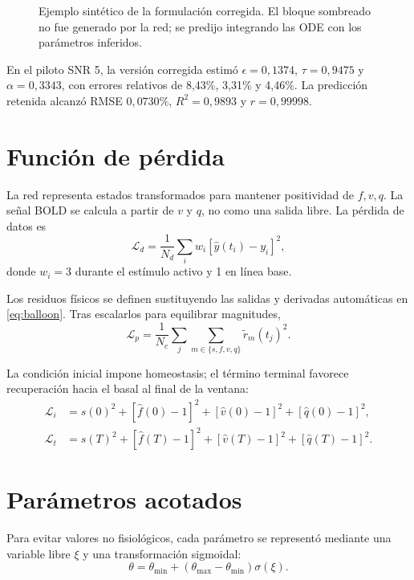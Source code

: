 \begin{figure}[H]
\centering
{}
\caption{Ejemplo sintético de la formulación corregida. El bloque sombreado no fue generado por la red; se predijo integrando las ODE con los parámetros inferidos.}
\label{fig:pinn_corrected}
\end{figure}

En el piloto SNR 5, la versión corregida estimó $\epsilon=0{,}1374$, $\tau=0{,}9475$ y $\alpha=0{,}3343$, con errores relativos de 8,43\%, 3,31\% y 4,46\%. La predicción retenida alcanzó RMSE $0{,}0730\%$, $R^2=0{,}9893$ y $r=0{,}99998$.

\section{Función de pérdida}
La red representa estados transformados para mantener positividad de $f,v,q$. La señal BOLD se calcula a partir de $v$ y $q$, no como una salida libre. La pérdida de datos es
\begin{equation}
\mathcal L_d=\frac{1}{N_d}\sum_i w_i\left[\hat y(t_i)-y_i\right]^2,
\end{equation}
donde $w_i=3$ durante el estímulo activo y 1 en línea base.

Los residuos físicos se definen sustituyendo las salidas y derivadas automáticas en \cref{eq:balloon}. Tras escalarlos para equilibrar magnitudes,
\begin{equation}
\mathcal L_p=\frac{1}{N_c}\sum_j\sum_{m\in\{s,f,v,q\}} \tilde r_m(t_j)^2.
\end{equation}

La condición inicial impone homeostasis; el término terminal favorece recuperación hacia el basal al final de la ventana:
\begin{align}
\mathcal L_i &= \hat s(0)^2+[\hat f(0)-1]^2+[\hat v(0)-1]^2+[\hat q(0)-1]^2,\\
\mathcal L_t &= \hat s(T)^2+[\hat f(T)-1]^2+[\hat v(T)-1]^2+[\hat q(T)-1]^2.
\end{align}

\section{Parámetros acotados}
Para evitar valores no fisiológicos, cada parámetro se representó mediante una variable libre $\xi$ y una transformación sigmoidal:
\begin{equation}
\theta=\theta_{\min}+(\theta_{\max}-\theta_{\min})\sigma(\xi).
\end{equation}

